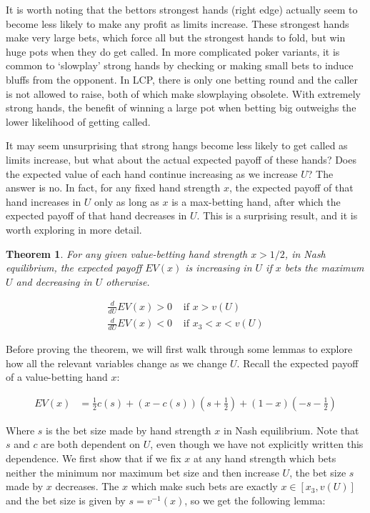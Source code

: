 \documentclass[a4paper,12pt]{article}
\theoremstyle{plain}
\newtheorem{theorem}{Theorem}[section]
\theoremstyle{definition}
\begin{document}

It is worth noting that the bettors strongest hands (right edge) actually seem to become less likely to make any profit as limits increase. These strongest hands make very large bets, which force all but the strongest hands to fold, but win huge pots when they do get called. In more complicated poker variants, it is common to `slowplay' strong hands by checking or making small bets to induce bluffs from the opponent. In LCP, there is only one betting round and the caller is not allowed to raise, both of which make slowplaying obsolete. With extremely strong hands, the benefit of winning a large pot when betting big outweighs the lower likelihood of getting called.

It may seem unsurprising that strong hangs become less likely to get called as limits increase, but what about the actual expected payoff of these hands? Does the expected value of each hand continue increasing as we increase $U$? The answer is no. In fact, for any fixed hand strength $x$, the expected payoff of that hand increases in $U$ only as long as $x$ is a max-betting hand, after which the expected payoff of that hand decreases in $U$. This is a surprising result, and it is worth exploring in more detail.

\begin{theorem}
    For any given value-betting hand strength $x>1/2$, in Nash equilibrium, the expected payoff $EV(x)$ is increasing in $U$ if $x$ bets the maximum $U$ and decreasing in $U$ otherwise.

    \begin{align*}
        \frac{d}{dU} EV(x) > 0 & \text{ if } x > v(U) \\ 
        \frac{d}{dU} EV(x) < 0 & \text{ if } x_3 < x < v(U) 
    \end{align*}
\end{theorem}

Before proving the theorem, we will first walk through some lemmas to explore how all the relevant variables change as we change $U$. Recall the expected payoff of a value-betting hand $x$:

\begin{align*}
    EV(x) & = \frac{1}{2} c(s) + (x - c(s)) \left(s+\frac{1}{2}\right) + (1-x) \left(-s-\frac{1}{2}\right)
\end{align*}

Where $s$ is the bet size made by hand strength $x$ in Nash equilibrium. Note that $s$ and $c$ are both dependent on $U$, even though we have not explicitly written this dependence. We first show that if we fix $x$ at any hand strength which bets neither the minimum nor maximum bet size and then increase $U$, the bet size $s$ made by $x$ decreases. The $x$ which make such bets are exactly $x \in [x_3, v(U)]$ and the bet size is given by $s = v^{-1}(x)$, so we get the following lemma:
\end{document}
